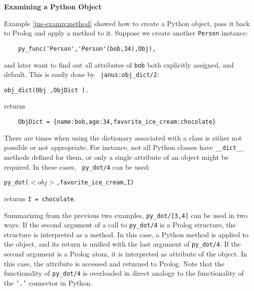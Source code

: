 \begin{example} \rm {\bf Examining a Python Object} \label{jns-examp:exam-object}

\noindent
Example \ref{jns-examp:method} showed how to create a Python object,
pass it back to Prolog and apply a method to it.  Suppose we create
another {\tt Person} instance:

\begin{verbatim}
    py_func('Person','Person'(bob,34),Obj),
\end{verbatim}
\noindent
and later want to find out all attributes of {\tt bob} both explicitly
assigned, and default.  This is easily done by {\tt
  janus:obj\_dict/2}:

{\tt obj\_dict(Obj ,ObjDict ).}

\noindent
returns
\begin{verbatim}
    ObjDict = {name:bob,age:34,favorite_ice_cream:chocolate}
\end{verbatim}

There are times when using the dictionary associated with a class is
either not possible or not appropriate.  For instance, not all Python
classes have {\tt \_\_dict\_\_} methods defined for them, or only a
single attribute of an object might be required.  In these cases, {\tt
  py\_dot/4} can be used:

{\tt    py\_dot($<obj>$,favorite\_ice\_cream,I)}

\noindent
returns {\tt I = chocolate}.

\noindent
Summarizing from the previous two examples, {\tt py\_dot/[3,4]} can be
used in two ways.  If the second argument of a call to {\tt py\_dot/4}
is a Prolog structure, the structure is interpreted as a method.  In
this case, a Python method is applied to the object, and its return is
unified with the last argument of {\tt py\_dot/4}. If the second
argument is a Prolog atom, it is interpreted as attribute of the
object.  In this case, the attribute is accessed and returned to
Prolog.  Note that the functionality of {\tt py\_dot/4} is overloaded
in direct analogy to the functionality of the {\tt '.'} connector in
Python.
\end{example}

